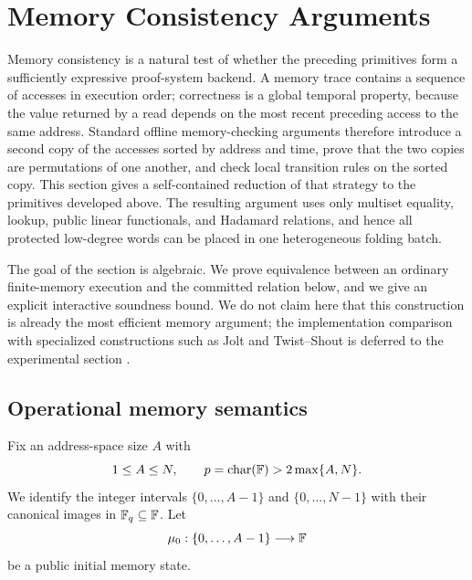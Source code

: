 \section{Memory Consistency Arguments}
\label{sec:memory}

Memory consistency is a natural test of whether the preceding primitives form a sufficiently expressive proof-system backend.  A memory trace contains a sequence of accesses in execution order; correctness is a global temporal property, because the value returned by a read depends on the most recent preceding access to the same address.  Standard offline memory-checking arguments therefore introduce a second copy of the accesses sorted by address and time, prove that the two copies are permutations of one another, and check local transition rules on the sorted copy.  This section gives a self-contained reduction of that strategy to the primitives developed above.  The resulting argument uses only multiset equality, lookup, public linear functionals, and Hadamard relations, and hence all protected low-degree words can be placed in one heterogeneous folding batch.

The goal of the section is algebraic.  We prove equivalence between an ordinary finite-memory execution and the committed relation below, and we give an explicit interactive soundness bound.  We do not claim here that this construction is already the most efficient memory argument; the implementation comparison with specialized constructions such as Jolt and Twist--Shout is deferred to the experimental section \cite{Jolt23,TwistShout26}.

\subsection{Operational memory semantics}
\label{sec:memory-operational}

Fix an address-space size $A$ with
\begin{equation}
  1\le A\le N,
  \qquad
  p=\operatorname{char}(\mathbb{F})>2\max\{A,N\}.
  \label{eq:memory-characteristic}
\end{equation}
We identify the integer intervals $\{0,\ldots,A-1\}$ and $\{0,\ldots,N-1\}$ with their canonical images in $\mathbb{F}_q\subseteq\mathbb{F}$.  Let
\begin{equation}
  \mu_0:\{0,\ldots,A-1\}\longrightarrow\mathbb{F}
  \label{eq:memory-initial-state}
\end{equation}
be a public initial memory state.

